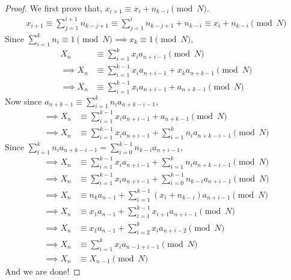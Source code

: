 \begin{proof}
    We first prove that, $x_{i+1} \equiv x_{i} + n_{k-i} \pmod{N}$. 
    \begin{align*}
        x_{i+1} \equiv \sum_{j=1}^{i+1} n_{k-j+1} 
                \equiv \sum_{j=1}^{i} n_{k-j+1} + n_{k-i} 
                \equiv x_{i} + n_{k-i} \pmod{N}
    \end{align*}
    Since $\sum_{i=1}^{k} n_{i} \equiv 1 \pmod{N} \implies x_{k} \equiv 1 \pmod{N}$,
    \begin{align*}
                 X_{n} &\equiv \sum_{i=1}^{k} x_{i} a_{n+i-1} \pmod{N} \\
        \implies X_{n} &\equiv \sum_{i=1}^{k-1} x_{i} a_{n+i-1} + x_{k} a_{n+k-1} \pmod{N} \\
        \implies X_{n} &\equiv \sum_{i=1}^{k-1} x_{i} a_{n+i-1} + a_{n+k-1} \pmod{N}
    \end{align*}
    Now since $a_{n+k-1}\equiv \sum_{i=1}^{k} n_{i} a_{n+k-i-1}$,
    \begin{align*}
       \implies X_{n} &\equiv \sum_{i=1}^{k-1} x_{i} a_{n+i-1} + a_{n+k-1} \pmod{N} \\
       \implies X_{n} &\equiv \sum_{i=1}^{k-1} x_{i} a_{n+i-1} + \sum_{i=1}^{k} n_{i} a_{n+k-i-1} \pmod{N}
    \end{align*}
    Since $\sum_{i=1}^{k} n_{i} a_{n+k-i-1} = \sum_{i=0}^{k-1} n_{k-i} a_{n+i-1}$,
    \begin{align*}
       \implies X_{n} &\equiv \sum_{i=1}^{k-1} x_{i} a_{n+i-1} + \sum_{i=1}^{k} n_{i} a_{n+k-i-1} \pmod{N} \\
       \implies X_{n} &\equiv \sum_{i=1}^{k-1} x_{i} a_{n+i-1} + \sum_{i=0}^{k-1} n_{k-i} a_{n+i-1} \pmod{N} \\
       \implies X_{n} &\equiv n_{k} a_{n-1} + \sum_{i=1}^{k-1} \left( x_{i} + n_{k-i} \right) a_{n+i-1} \pmod{N} \\
       \implies X_{n} &\equiv x_{1} a_{n-1} + \sum_{i=1}^{k-1} x_{i+1} a_{n+i-1} \pmod{N} \\
       \implies X_{n} &\equiv x_{1} a_{n-1} + \sum_{i=2}^{k} x_{i} a_{n+i-2} \pmod{N} \\
       \implies X_{n} &\equiv \sum_{i=1}^{k} x_{i} a_{n-1+i-1} \pmod{N} \\
       \implies X_{n} &\equiv X_{n-1} \pmod{N}
    \end{align*}
    And we are done!
\end{proof}

